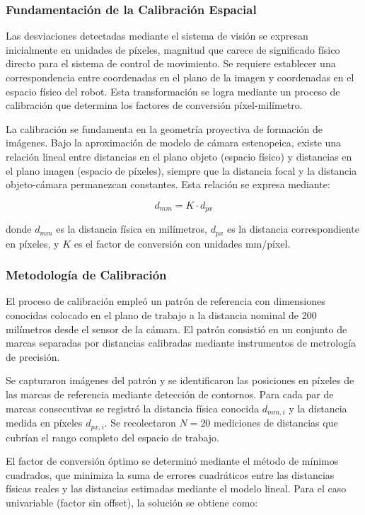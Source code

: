 \subsubsection{Fundamentación de la Calibración Espacial}

Las desviaciones detectadas mediante el sistema de visión se expresan inicialmente en unidades de píxeles, magnitud que carece de significado físico directo para el sistema de control de movimiento. Se requiere establecer una correspondencia entre coordenadas en el plano de la imagen y coordenadas en el espacio físico del robot. Esta transformación se logra mediante un proceso de calibración que determina los factores de conversión píxel-milímetro.

La calibración se fundamenta en la geometría proyectiva de formación de imágenes. Bajo la aproximación de modelo de cámara estenopeica, existe una relación lineal entre distancias en el plano objeto (espacio físico) y distancias en el plano imagen (espacio de píxeles), siempre que la distancia focal y la distancia objeto-cámara permanezcan constantes. Esta relación se expresa mediante:

\begin{equation}
d_{mm} = K \cdot d_{px}
\end{equation}

donde $d_{mm}$ es la distancia física en milímetros, $d_{px}$ es la distancia correspondiente en píxeles, y $K$ es el factor de conversión con unidades mm/píxel.

\subsubsection{Metodología de Calibración}

El proceso de calibración empleó un patrón de referencia con dimensiones conocidas colocado en el plano de trabajo a la distancia nominal de 200 milímetros desde el sensor de la cámara. El patrón consistió en un conjunto de marcas separadas por distancias calibradas mediante instrumentos de metrología de precisión.

Se capturaron imágenes del patrón y se identificaron las posiciones en píxeles de las marcas de referencia mediante detección de contornos. Para cada par de marcas consecutivas se registró la distancia física conocida $d_{mm,i}$ y la distancia medida en píxeles $d_{px,i}$. Se recolectaron $N = 20$ mediciones de distancias que cubrían el rango completo del espacio de trabajo.

El factor de conversión óptimo se determinó mediante el método de mínimos cuadrados, que minimiza la suma de errores cuadráticos entre las distancias físicas reales y las distancias estimadas mediante el modelo lineal. Para el caso univariable (factor sin offset), la solución se obtiene como:

